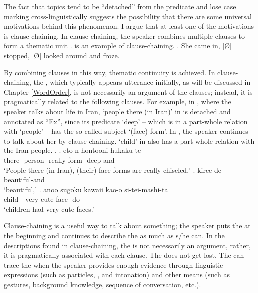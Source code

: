 The fact that topics tend to be ``detached'' from the predicate and
lose case marking cross-linguistically suggests the possibility that
there are some universal motivations behind this phenomenon.
I argue that at least one of the motivations is clause-chaining.
In clause-chaining,
the speaker combines multiple clauses to form a thematic unit
\cite{longacre85,martin92,givon01}.
\Next is an example of clause-chaining.
%
\ex. She came in, [\O] stopped, [\O] looked around and froze.\\
     \hfill{\cite[349]{givon01}}

By combining clauses in this way,
thematic continuity is achieved.
In clause-chaining,
the , which typically appears utterance-initially, as will be discussed in Chapter \ref{WordOrder},
is not necessarily an argument of the clauses;
instead, it is pragmatically related to the following clauses.
For example, in \Next,
where the speaker talks about life in Iran,
 `people there (in Iran)' in \Next[a] is detached
and annotated as ``Ex'', since its predicate  `deep' -- which is in a part-whole relation with `people' -- has the so-called subject  `(face) form'.
In \Next[b-c], the speaker continues to talk about her
by clause-chaining.
 `child' in \Next[c] also has a part-whole relation
with the Iran people.
%
\ex.
 \ag. eto n   hontooni  hukaku-te \\
        there- person- really form- deep-and \\
      `People there (in Iran), (their) face forms are really chiseled,'
 \bg. kiree-de \\
      beautiful-and \\
      `beautiful,'
 \bg.  anoo sugoku kawaii kao-o si-tei-mashi-ta \\
      child--  very cute face- do--- \\
      `children had very cute faces.'

Clause-chaining is a useful way to talk about something;
the speaker puts the  at the beginning and
continues to describe the  as much as s/he can.
In the descriptions found in clause-chaining,
the  is not necessarily an argument, rather, it is pragmatically associated with each clause.
The  does not get lost.
The  can trace the 
when the speaker provides enough evidence
through linguistic expressions (such as particles, , and intonation) and other means (such as gestures, background knowledge, sequence of conversation, etc.).

